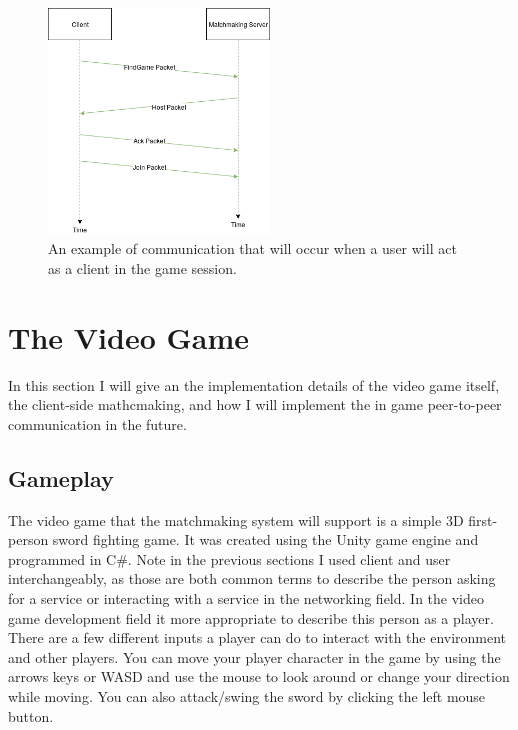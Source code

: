\documentclass[conference]{IEEEtran}
\begin{document}
\begin{figure}[h]
\centerline{\includegraphics[width=\linewidth, height=6cm]{figures/HostCommunication.png}}
\caption{An example of communication that will occur when a user will act as a client in the game session. }
\label{fig}
\end{figure}

\section{The Video Game}
In this section I will give an the implementation details of the video game itself, the client-side mathcmaking, and how I will implement the in game peer-to-peer communication in the future.
\subsection{Gameplay}
The video game that the matchmaking system will support is a simple 3D first-person sword fighting game.
It was created using the Unity game engine and programmed in C#.
Note in the previous sections I used  client and user interchangeably, as those are both common terms to describe the person asking for a service or interacting with a service in the networking field.
In the video game development field it more appropriate to describe this person as a player.
There are a few different inputs a player can do to interact with the environment and other players.
You can move your player character in the game by using the arrows keys or WASD and use the mouse to look around or change your direction while moving.
You can also attack/swing the sword by clicking the left mouse button.
\end{document}
